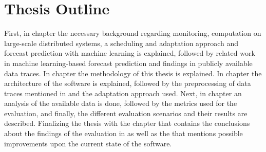         

        
        \section{Thesis Outline}
        \label{sec:thesis-outline-introduction}

            First, in chapter  the necessary background regarding monitoring, computation on large-scale distributed systems, a scheduling and adaptation approach and forecast prediction with machine learning is explained, followed by related work in machine learning-based forecast prediction and findings in publicly available data traces.
            In chapter  the methodology of this thesis is explained. 
            In chapter  the architecture of the software is explained, followed by the preprocessing of data traces mentioned in  and the adaptation approach used.
            Next, in chapter  an analysis of the available data is done, followed by the metrics used for the evaluation, and finally, the different evaluation scenarios and their results are described.
            Finalizing the thesis with the chapter  that contains the conclusions about the findings of the evaluation in  as well as the  that mentions possible improvements upon the current state of the software.


